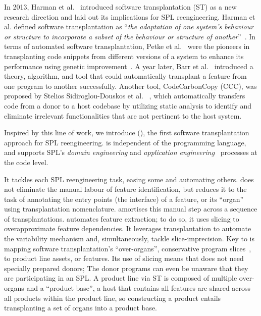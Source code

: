 In 2013, Harman et al.~\cite{Harman2013} introduced software transplantation (ST) as a new research direction and laid out its implications for SPL reengineering. Harman et al. defined software transplantation as ``\emph{the adaptation of one system's behaviour or structure to incorporate a subset of the behaviour or structure of another}''~\cite{Harman2013}. In terms of automated software transplantation, Petke et al.~\cite{Petke2014,Petke2018} were the pioneers in transplanting code snippets from different versions of a system to enhance its performance using genetic improvement~\cite{Petke18}. A year later,  Barr et al.~\cite{Barr2015} introduced a theory, algorithm, and tool that could automatically transplant  a feature from one program to another successfully. Another tool, CodeCarbonCopy (CCC), was proposed by Stelios Sidiroglou-Douskos et al.~\cite{Sidiroglou2017} , which automatically transfers code from a donor to a host codebase by utilizing static analysis to identify and eliminate irrelevant functionalities that are not pertinent to the host system.

Inspired by this line of work, we introduce \FOUNDRY (), the first software transplantation approach for SPL reengineering. \FOUNDRY is independent of the programming language, and supports SPL's \emph{domain engineering} and \emph{application engineering}~\cite{Clements2001} processes at the code level. 

It tackles each SPL reengineering task, easing some and automating others. \FOUNDRY does not eliminate the manual labour of feature identification, but reduces it to the task of annotating the entry points (\ie the interface) of a feature, or its ``organ'' using transplantation nomenclature. \FOUNDRY amortises this manual step across a sequence of transplantations. 
\FOUNDRY  automates feature extraction; to do so, it uses slicing to overapproximate feature dependencies.  It leverages transplantation to automate the variability mechanism and, simultaneously, tackle slice-imprecision.
Key to \FOUNDRY is mapping software transplantation's ``over-organs'', conservative program slices~\cite{Barr2015}, to product line assets, or features. 
Its use of slicing means that \FOUNDRY does not need specially prepared donors; The donor programs can even be unaware that they are participating in an SPL. A product line via ST is composed of multiple over-organs and a ``product base'', a host that contains all features are shared across all products within the product line, so constructing a product entails transplanting a set of organs into a product base. 

